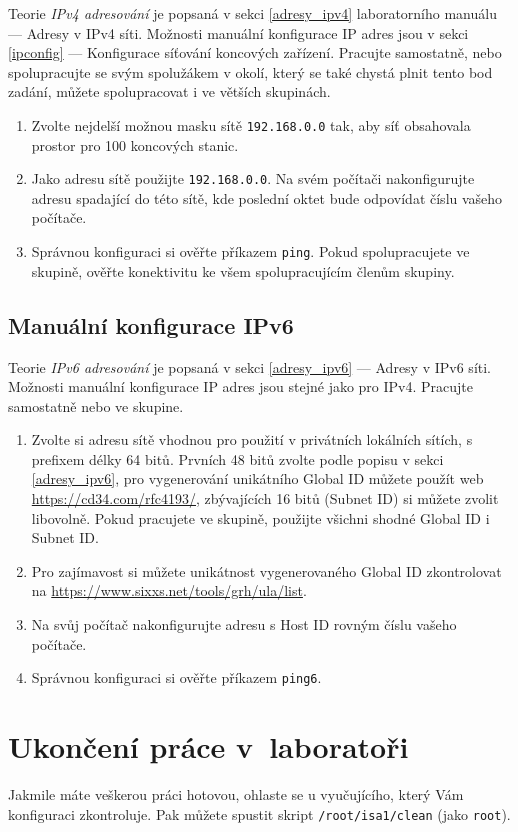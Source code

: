 Teorie \emph{IPv4 adresování} je popsaná v sekci \ref{adresy_ipv4} laboratorního manuálu --- Adresy v IPv4 síti.
Možnosti manuální konfigurace IP adres jsou v sekci \ref{ipconfig} --- Konfigurace síťování koncových zařízení.
Pracujte samostatně, nebo spolupracujte se svým spolužákem v okolí, který se také
chystá plnit tento bod zadání, můžete spolupracovat i ve větších skupinách.

\begin{enumerate}
    \item Zvolte nejdelší možnou masku sítě \texttt{192.168.0.0} tak, aby síť obsahovala prostor pro 100 koncových stanic.
    \item Jako adresu sítě použijte \texttt{192.168.0.0}. Na svém počítači
      nakonfigurujte adresu spadající do této sítě, kde poslední oktet bude
      odpovídat číslu vašeho počítače.
    \item Správnou konfiguraci si ověřte příkazem {\tt ping}. Pokud
      spolupracujete ve skupině, ověřte konektivitu ke všem spolupracujícím
      členům skupiny.
\end{enumerate}

\subsection{Manuální konfigurace IPv6}
Teorie \emph{IPv6 adresování} je popsaná v sekci \ref{adresy_ipv6} --- Adresy v IPv6 síti.
Možnosti manuální konfigurace IP adres jsou stejné jako pro IPv4. Pracujte
samostatně nebo ve skupine.

\begin{enumerate}
    \item Zvolte si adresu sítě vhodnou pro použití v privátních lokálních
        sítích, s prefixem délky 64 bitů. Prvních 48 bitů zvolte podle popisu v
        sekci \ref{adresy_ipv6}, pro vygenerování unikátního Global ID můžete
        použít web \url{https://cd34.com/rfc4193/}, zbývajících 16 bitů (Subnet
        ID) si můžete zvolit libovolně. Pokud pracujete ve skupině, použijte
        všichni shodné Global ID i Subnet ID.
    \item Pro zajímavost si můžete unikátnost vygenerovaného Global ID
        zkontrolovat na \url{https://www.sixxs.net/tools/grh/ula/list}.
    \item Na svůj počítač nakonfigurujte adresu s Host ID rovným číslu vašeho
      počítače.
    \item Správnou konfiguraci si ověřte příkazem {\tt ping6}.
\end{enumerate}

\section{Ukončení práce v~laboratoři}
Jakmile máte veškerou práci hotovou, ohlaste se u vyučujícího, který Vám
konfiguraci zkontroluje. Pak můžete spustit skript {\tt /root/isa1/clean} (jako
\texttt{root}).
